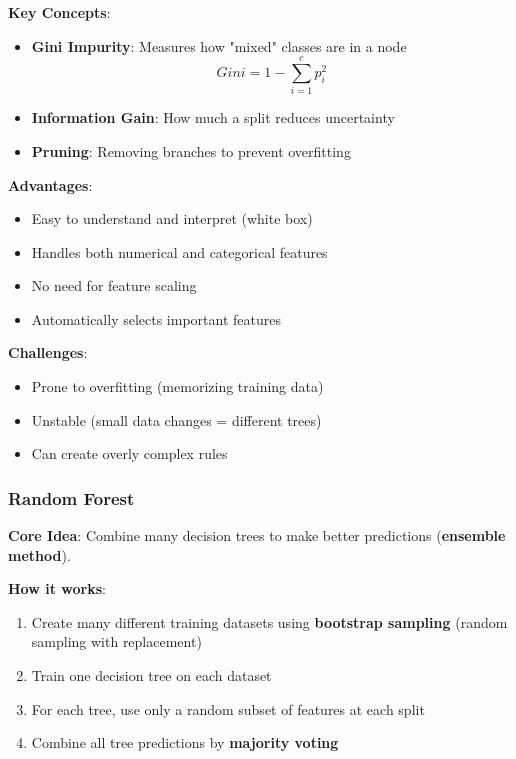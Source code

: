 \textbf{Key Concepts}:
\begin{itemize}
    \item \textbf{Gini Impurity}: Measures how "mixed" classes are in a node
    \begin{equation}
    Gini = 1 - \sum_{i=1}^{c} p_i^2
    \end{equation}
    \item \textbf{Information Gain}: How much a split reduces uncertainty
    \item \textbf{Pruning}: Removing branches to prevent overfitting
\end{itemize}

\textbf{Advantages}:
\begin{itemize}
    \item Easy to understand and interpret (white box)
    \item Handles both numerical and categorical features
    \item No need for feature scaling
    \item Automatically selects important features
\end{itemize}

\textbf{Challenges}:
\begin{itemize}
    \item Prone to overfitting (memorizing training data)
    \item Unstable (small data changes = different trees)
    \item Can create overly complex rules
\end{itemize}

\subsubsection{Random Forest}
\textbf{Core Idea}: Combine many decision trees to make better predictions (\textbf{ensemble method}).

\textbf{How it works}:
\begin{enumerate}
    \item Create many different training datasets using \textbf{bootstrap sampling} (random sampling with replacement)
    \item Train one decision tree on each dataset
    \item For each tree, use only a random subset of features at each split
    \item Combine all tree predictions by \textbf{majority voting}
\end{enumerate}

